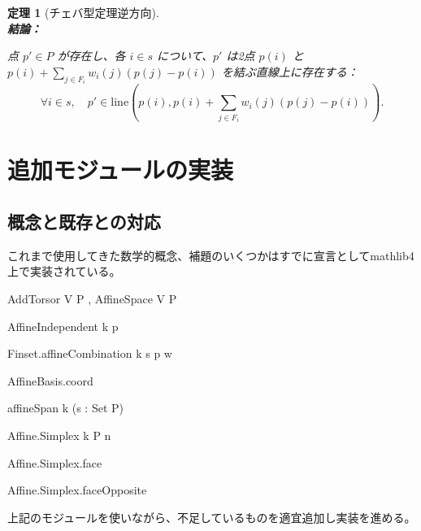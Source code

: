 \documentclass[a4paper,12pt]{bxjsbook}
\makeatletter
\newlength{\customindent}
\newenvironment{body}{
  \par
  \begingroup
  \setlength{\leftskip}{\customindent}
  \setlength{\rightskip}{0pt}
  \setlength{\parindent}{1em}
  \setlength{\displayindent}{\customindent}
  \setlength{\displaywidth}{\dimexpr\linewidth-\customindent\relax}
}{
  \par
  \endgroup
}
\theoremstyle{theorem}
\newtheorem{theorem}{定理}[chapter]
\renewenvironment{proof}[1][\proofname]{%
  \par\pushQED{\qed}%
  \normalfont
  \topsep6\p@\@plus6\p@\relax
  \list{}{%
    \leftmargin=\customindent
    \rightmargin=0pt
    \labelwidth=0pt
    \labelsep=0pt
    \itemindent=0pt
    \listparindent=0pt
    \parsep=0pt
  }%
  \item[\itshape #1\@addpunct{.}\hspace{0.5em}]%
  \setlength{\displayindent}{\customindent}%
  \setlength{\displaywidth}{\dimexpr\linewidth-\customindent\relax}%
  \ignorespaces
}{%
  \popQED\endlist\@endpefalse
}
\makeatother
\begin{document}
\begin{theorem}[チェバ型定理逆方向]
        \noindent\textbf{\\結論：}\par
        \begin{theoremenumerate}[label=(C\arabic*), leftmargin=4em, topsep=2pt, partopsep=0pt, itemsep=0pt, parsep=0pt]
            \item 点 $p' \in P$ が存在し、各 $i \in s$ について、$p'$ は2点 $p(i)$ と $p(i) + \sum_{j \in F_i} w_i(j)(p(j) - p(i))$ を結ぶ直線上に存在する：
            \[
            \forall i \in s, \quad p' \in \mathrm{line}\left(p(i), p(i) + \sum_{j \in F_i} w_i(j)(p(j) - p(i))\right).
            \]
        \end{theoremenumerate}
    \end{theorem}



    \section{追加モジュールの実装}
    \subsection{概念と既存との対応}
    \begin{body}
        \indent これまで使用してきた数学的概念、補題のいくつかはすでに宣言としてmathlib4上で実装されている。
        \begin{bodyitemize}
            \item[アフィン空間] AddTorsor V P , AffineSpace V P
            \item[アフィン独立] AffineIndependent k p
            \item[アフィン結合] Finset.affineCombination k s p w
            \item[重心座標] AffineBasis.coord
            \item[アフィン包] affineSpan k (s : Set P)
            \item[凸包] %
            \item[単体] Affine.Simplex k P n
            \item[面] Affine.Simplex.face
            \item[対向面] Affine.Simplex.faceOpposite
        \end{bodyitemize}

        \indent 上記のモジュールを使いながら、不足しているものを適宜追加し実装を進める。
    \end{body}
\end{document}
